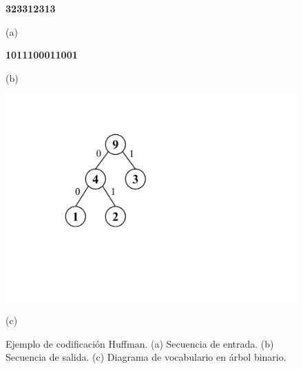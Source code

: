\begin{figure}%
    	\centering
    	\begin{minipage}{0.45\textwidth}
    		\centering

		\textbf{\large \textcolor{color3}{3}\textcolor{color2}{2}\textcolor{color3}{3}\textcolor{color3}{3}\textcolor{color1}{1}\textcolor{color2}{2}\textcolor{color3}{3}\textcolor{color1}{1}\textcolor{color3}{3}}
    		
    		(a)
		\vspace{10mm}  		
    		
    		\textbf{\large \textcolor{color3}{1}\textcolor{color2}{01}\textcolor{color3}{1}\textcolor{color3}{1}\textcolor{color1}{00}\textcolor{color2}{01}\textcolor{color3}{1}\textcolor{color1}{00}\textcolor{color3}{1}}
    		
    		(b)
    	\end{minipage}
    	\begin{minipage}{0.45\textwidth}
    		\centering
    		\includegraphics[scale=.4, clip, trim=160 200 410 100]{img/graphs-huffman.pdf}
    		
    		(c)
    	\end{minipage}

    \caption{Ejemplo de codificación Huffman. (a) Secuencia de entrada. (b) Secuencia de salida. (c) Diagrama de vocabulario en árbol binario.}
    \label{fig:huffman}
\end{figure}

